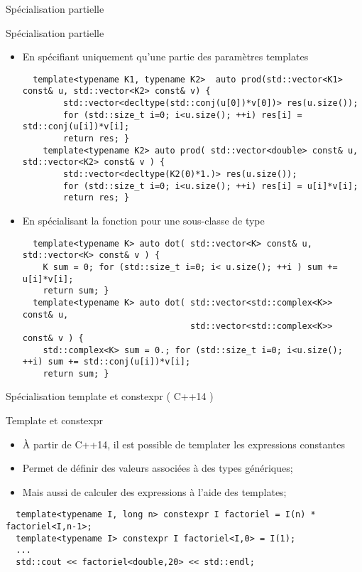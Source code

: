 \documentclass[compress,10pt,aspectratio=169]{beamer}
\begin{document}
\begin{frame}[fragile]{Spécialisation partielle}
    \scriptsize\vspace*{-4mm}
    \begin{block}{\small Spécialisation partielle}
    \begin{itemize}
    \item En spécifiant uniquement qu'une partie des paramètres templates
  \begin{verbatim}
  template<typename K1, typename K2>  auto prod(std::vector<K1> const& u, std::vector<K2> const& v) {
        std::vector<decltype(std::conj(u[0])*v[0])> res(u.size());
        for (std::size_t i=0; i<u.size(); ++i) res[i] = std::conj(u[i])*v[i];
        return res; }  
    template<typename K2> auto prod( std::vector<double> const& u, std::vector<K2> const& v ) {
        std::vector<decltype(K2(0)*1.)> res(u.size());
        for (std::size_t i=0; i<u.size(); ++i) res[i] = u[i]*v[i];
        return res; }
  \end{verbatim}
    \item En spécialisant la fonction pour une sous-classe de type
  \begin{verbatim}
  template<typename K> auto dot( std::vector<K> const& u, std::vector<K> const& v ) {
    K sum = 0; for (std::size_t i=0; i< u.size(); ++i ) sum += u[i]*v[i];
    return sum; }
  template<typename K> auto dot( std::vector<std::complex<K>> const& u,
                                 std::vector<std::complex<K>> const& v ) {
    std::complex<K> sum = 0.; for (std::size_t i=0; i<u.size(); ++i) sum += std::conj(u[i])*v[i];
    return sum; }
  \end{verbatim}
  \end{itemize}
  \end{block}
\end{frame}

\begin{frame}[fragile]{Spécialisation template et constexpr ( C++14 )}
  \scriptsize
  \begin{block}{\small Template et constexpr}
  \begin{itemize}
  \item À partir de C++14, il est possible de templater les expressions constantes
  \item Permet de définir des valeurs associées à des types génériques;
  \item Mais aussi de calculer des expressions à l'aide des templates;
  \end{itemize}
  \begin{verbatim}
  template<typename I, long n> constexpr I factoriel = I(n) * factoriel<I,n-1>;
  template<typename I> constexpr I factoriel<I,0> = I(1);
  ...
  std::cout << factoriel<double,20> << std::endl;
  \end{verbatim}
  \end{block}
\end{frame}
\end{document}
